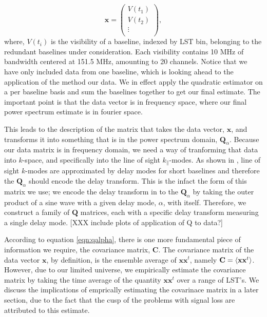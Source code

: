 \documentclass[twocolumn,numberedappendix]{emulateapj} \shorttitle{PSA64}
\newcommand{\x}{\mathbf{x}} \newcommand{\xhat}{\hat{\mathbf{x}}}
\begin{document}
\begin{equation}
\label{eqn:xvectdef}
\mathbf{x} = \left( \begin{array}{c}
V (t_{1}) \\
V (t_{2}) \\
\vdots \\
\end{array}
\right), 
\end{equation}
where, $V(t_{i})$ is the visibility of a baseline, indexed by LST bin,
belonging to the redundant baselines under consideration. Each visibility
contains 10 MHz of bandwidth centered at 151.5 MHz, amounting to 20 channels. 
Notice that we have only included data from one baseline, which is looking ahead
to the application of the method our data. We in effect apply the quadratic
estimator on a per baseline basis and sum the baselines together to get our
final estimate. The important point is that the data vector is in frequency
space, where our final power spectrum estimate is in fourier space. 

This leads to the description of the matrix that takes the data vector,
$\mathbf{x}$, and transforms it into something that is in the power spectrum
domain, $\mathbf{Q}_{\alpha}$. Because our data matrix is in frequency domain,
we need a way of tranforming that data into $k$-space, and specifically into
the line of sight $k_{\parallel}$-modes. As shown in \cite{parsons_et_al2012b},
line of sight $k$-modes are approximated by delay modes for short baselines and
therefore the $\mathbf{Q}_{\alpha}$ should encode the delay transform. This is
the infact the form of this matrix we use; we encode the delay transform in to
the $\mathbf{Q}_{\alpha}$ by taking the outer product of a sine wave with a
given delay mode, $\alpha$,  with itself.  Therefore, we construct a family of
$\mathbf{Q}$ matrices, each with a specific delay transform measuring a single
delay mode. [XXX include plots of application of Q to data?]

According to equation \ref{eqn:qalpha}, there is one more fundamental piece of
information we require, the covariance matrix, $\mathbf{C}$. The covariance
matrix of the data vector $\x$, by definition, is the ensemble average of
$\x\x^{t}$, namely $\mathbf{C} = \expval{\x\x^{t}}$. However, due to our limited
universe, we empirically estimate the covariance matrix by taking the time average of the
quantity $\x\x^{t}$ over a range of LST's. We discuss the implications of
emprically estimating the covarinace matrix in a later section, due to the fact
that the cusp of the problems with signal loss are attributed to this estimate.
\end{document}
